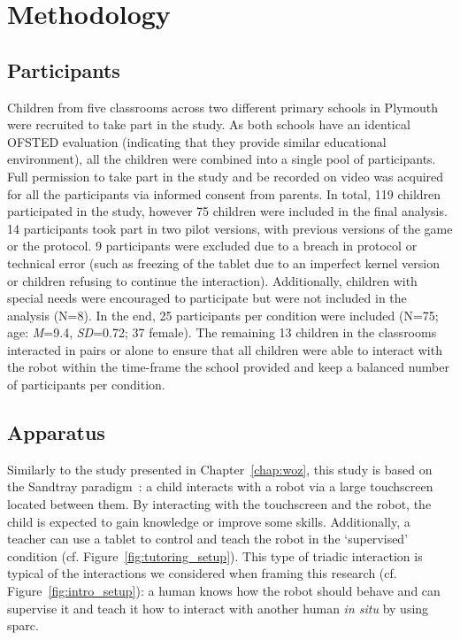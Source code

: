 \section{Methodology}

\subsection{Participants}

Children from five classrooms across two different primary schools in Plymouth were recruited to take part in the study. As both schools have an identical OFSTED evaluation (indicating that they provide similar educational environment), all the children were combined into a single pool of participants. Full permission to take part in the study and be recorded on video was acquired for all the participants via informed consent from parents. In total, 119 children participated in the study, however 75 children were included in the final analysis. 14 participants took part in two pilot versions, with previous versions of the game or the protocol. 9 participants were excluded due to a breach in protocol or technical error (such as freezing of the tablet due to an imperfect kernel version or children refusing to continue the interaction). Additionally, children with special needs were encouraged to participate but were not included in the analysis (N=8). In the end, 25 participants per condition were included (N=75; age: \textit{M}=9.4, \textit{SD}=0.72; 37 female). The remaining 13 children in the classrooms interacted in pairs or alone to ensure that all children were able to interact with the robot within the time-frame the school provided and keep a balanced number of participants per condition. 

\subsection{Apparatus}

Similarly to the study presented in Chapter~\ref{chap:woz}, this study is based on the Sandtray paradigm~\citep{baxter2012touchscreen}: a child interacts with a robot via a large touchscreen located between them. By interacting with the touchscreen and the robot, the child is expected to gain knowledge or improve some skills. Additionally, a teacher can use a tablet to control and teach the robot in the `supervised' condition (cf. Figure~\ref{fig:tutoring_setup}). This type of triadic interaction is typical of the interactions we considered when framing this research (cf. Figure~\ref{fig:intro_setup}): a human knows how the robot should behave and can supervise it and teach it how to interact with another human \textit{in situ} by using \gls{sparc}.

